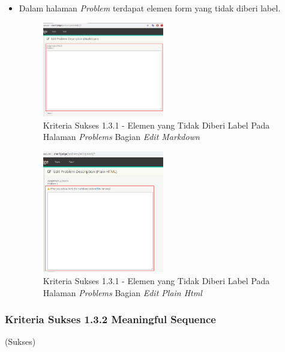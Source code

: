 \documentclass[a4paper,twoside]{article}
\begin{document}
\begin{enumerate}
\begin{itemize}
			\item Dalam halaman \textit{Problem} terdapat elemen form yang tidak diberi label.
			\begin{figure}[H]
				\centering  
				\includegraphics[width=0.5\textwidth]{kepatuhan_1_3_1_problem_edit_markdown}  
				\caption[Kriteria Sukses 1.3.1 - Elemen yang Tidak Diberi Label Pada Halaman \textit{Problems} Bagian \textit{Edit Markdown}]{Kriteria Sukses 1.3.1 - Elemen yang Tidak Diberi Label Pada Halaman \textit{Problems} Bagian \textit{Edit Markdown}} 
				\label{fig:kepatuhan_1_3_1_problem_edit_markdown} 
			\end{figure}
			\begin{figure}[H]
				\centering  
				\includegraphics[width=0.5\textwidth]{kepatuhan_1_3_1_edit_plain_html}  
				\caption[Kriteria Sukses 1.3.1 - Elemen yang Tidak Diberi Label Pada Halaman \textit{Problems} Bagian \textit{Edit Plain Html}]{Kriteria Sukses 1.3.1 - Elemen yang Tidak Diberi Label Pada Halaman \textit{Problems} Bagian \textit{Edit Plain Html}} 
				\label{fig:kepatuhan_1_3_1_plain_html} 
			\end{figure}
		\end{itemize}
		
		\subsubsection*{Kriteria Sukses 1.3.2 Meaningful Sequence}
		\label{subsubsec:kepatuhan_kriteria_1.3.2}
		(Sukses) \\
		

\end{enumerate}
\end{document}
